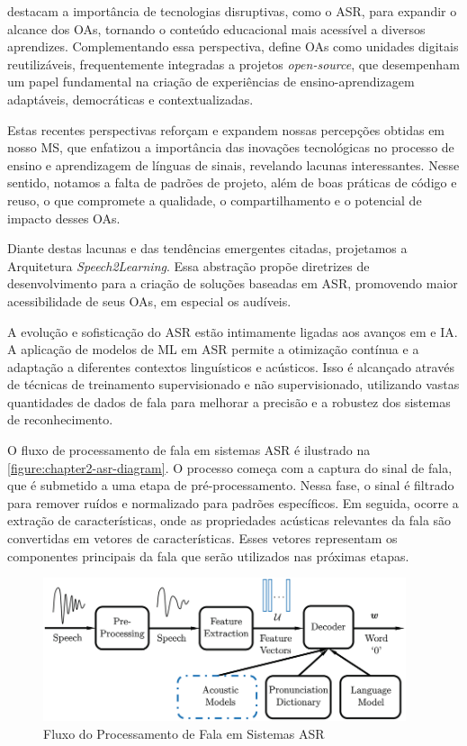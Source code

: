  destacam a importância de tecnologias disruptivas, como o ASR, para expandir o alcance dos OAs, tornando o conteúdo educacional mais acessível a diversos aprendizes. Complementando essa perspectiva,  define OAs como unidades digitais reutilizáveis, frequentemente integradas a projetos \textit{open-source}, que desempenham um papel fundamental na criação de experiências de ensino-aprendizagem adaptáveis, democráticas e contextualizadas.

Estas recentes perspectivas reforçam e expandem nossas percepções obtidas em nosso MS, que enfatizou a importância das inovações tecnológicas no processo de ensino e aprendizagem de línguas de sinais, revelando lacunas interessantes. Nesse sentido, notamos a falta de padrões de projeto, além de boas práticas de código e reuso, o que compromete a qualidade, o compartilhamento e o potencial de impacto desses OAs.

Diante destas lacunas e das tendências emergentes citadas, projetamos a Arquitetura \textit{Speech2Learning}. Essa abstração propõe diretrizes de desenvolvimento para a criação de soluções baseadas em ASR, promovendo maior acessibilidade de seus OAs, em especial os audíveis.

A evolução e sofisticação do ASR estão intimamente ligadas aos avanços em  e IA. A aplicação de modelos de ML em ASR permite a otimização contínua e a adaptação a diferentes contextos linguísticos e acústicos. Isso é alcançado através de técnicas de treinamento supervisionado e não supervisionado, utilizando vastas quantidades de dados de fala para melhorar a precisão e a robustez dos sistemas de reconhecimento.

O fluxo de processamento de fala em sistemas ASR é ilustrado na \autoref{figure:chapter2-asr-diagram}. O processo começa com a captura do sinal de fala, que é submetido a uma etapa de pré-processamento. Nessa fase, o sinal é filtrado para remover ruídos e normalizado para padrões específicos. Em seguida, ocorre a extração de características, onde as propriedades acústicas relevantes da fala são convertidas em vetores de características. Esses vetores representam os componentes principais da fala que serão utilizados nas próximas etapas.

\begin{figure}[htb]
\centering
\caption{Fluxo do Processamento de Fala em Sistemas ASR}
\label{figure:chapter2-asr-diagram}
\includegraphics[width=0.95\textwidth]{images/chapter2-asr-diagram.png}
\end{figure}

